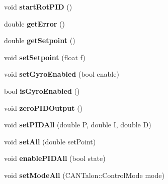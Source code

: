 \begin{DoxyCompactItemize}
\item 
\hypertarget{class_drive_bae_aad5e482e88ca3b39ca054cea1217dc6b}{}void {\bfseries start\+Rot\+P\+I\+D} ()\label{class_drive_bae_aad5e482e88ca3b39ca054cea1217dc6b}

\item 
\hypertarget{class_drive_bae_a813f9dfbe7bf7691de735c74e88548d2}{}double {\bfseries get\+Error} ()\label{class_drive_bae_a813f9dfbe7bf7691de735c74e88548d2}

\item 
\hypertarget{class_drive_bae_aaf5602f89bd043412f984251d458e74e}{}double {\bfseries get\+Setpoint} ()\label{class_drive_bae_aaf5602f89bd043412f984251d458e74e}

\item 
\hypertarget{class_drive_bae_a1b22dfabc63aa778c4a5d7eeef1c02e1}{}void {\bfseries set\+Setpoint} (float f)\label{class_drive_bae_a1b22dfabc63aa778c4a5d7eeef1c02e1}

\item 
\hypertarget{class_drive_bae_af8fc09ba2643e2813f46435592b86b3a}{}void {\bfseries set\+Gyro\+Enabled} (bool enable)\label{class_drive_bae_af8fc09ba2643e2813f46435592b86b3a}

\item 
\hypertarget{class_drive_bae_aa43736f6a503bac3f7bfb968a318e831}{}bool {\bfseries is\+Gyro\+Enabled} ()\label{class_drive_bae_aa43736f6a503bac3f7bfb968a318e831}

\item 
\hypertarget{class_drive_bae_a4b480bb19d803cffa8bac5fc3693bc1d}{}void {\bfseries zero\+P\+I\+D\+Output} ()\label{class_drive_bae_a4b480bb19d803cffa8bac5fc3693bc1d}

\item 
\hypertarget{class_drive_bae_a9e669140b1e6f1bd467a89df6fa1fed4}{}void {\bfseries set\+P\+I\+D\+All} (double P, double I, double D)\label{class_drive_bae_a9e669140b1e6f1bd467a89df6fa1fed4}

\item 
\hypertarget{class_drive_bae_abe2f4a4de059ac1479a165a07994a33c}{}void {\bfseries set\+All} (double set\+Point)\label{class_drive_bae_abe2f4a4de059ac1479a165a07994a33c}

\item 
\hypertarget{class_drive_bae_a210429543400fa3789576b1591ec4179}{}void {\bfseries enable\+P\+I\+D\+All} (bool state)\label{class_drive_bae_a210429543400fa3789576b1591ec4179}

\item 
\hypertarget{class_drive_bae_a7b6936f81aa8249e36998f3e371d44d9}{}void {\bfseries set\+Mode\+All} (C\+A\+N\+Talon\+::\+Control\+Mode mode)\label{class_drive_bae_a7b6936f81aa8249e36998f3e371d44d9}


\end{DoxyCompactItemize}

